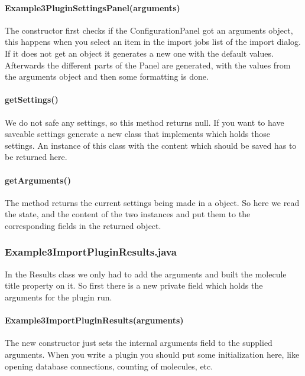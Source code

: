 \paragraph{Example3PluginSettingsPanel(arguments)}
The constructor first checks if the ConfigurationPanel got an arguments object, this happens when you select an item in the import jobs list of the import dialog. If it does not get an  object it generates a new one with the default values. Afterwards the different parts of the Panel are generated, with the values from the arguments object and then some formatting is done.

\paragraph{getSettings()}
We do not safe any settings, so this method returns null. If you want to have saveable settings generate a new class that implements  which holds those settings. An instance of this class with the content which should be saved has to be returned here.

\paragraph{getArguments()}
The  method returns the current settings being made in a  object. So here we read the  state, and the content of the two  instances and put them to the corresponding fields in the returned object.


\subsubsection{Example3ImportPluginResults.java}
In the Results class we only had to add the arguments and built the molecule title property on it.
So first there is a new private field  which holds the arguments for the plugin run.

\paragraph{Example3ImportPluginResults(arguments)}
The new constructor just sets the internal arguments field to the supplied arguments. When you write a plugin you should put some initialization here, like opening database connections, counting of molecules, etc.

